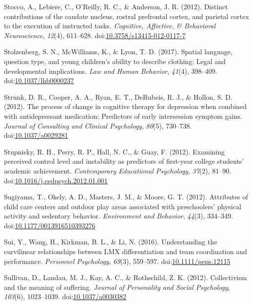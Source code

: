 \documentclass[english,man]{apa6}
\begin{document}
\hypertarget{ref-Stocco2012}{}
Stocco, A., Lebiere, C., O'Reilly, R. C., \& Anderson, J. R. (2012).
Distinct contributions of the caudate nucleus, rostral prefrontal
cortex, and parietal cortex to the execution of instructed tasks.
\emph{Cognitive, Affective, \& Behavioral Neuroscience}, \emph{12}(4),
611--628.
doi:\href{https://doi.org/10.3758/s13415-012-0117-7}{10.3758/s13415-012-0117-7}

\hypertarget{ref-Stolzenberg2017}{}
Stolzenberg, S. N., McWilliams, K., \& Lyon, T. D. (2017). Spatial
language, question type, and young children's ability to describe
clothing: Legal and developmental implications. \emph{Law and Human
Behavior}, \emph{41}(4), 398--409.
doi:\href{https://doi.org/10.1037/lhb0000237}{10.1037/lhb0000237}

\hypertarget{ref-Strunk2012}{}
Strunk, D. R., Cooper, A. A., Ryan, E. T., DeRubeis, R. J., \& Hollon,
S. D. (2012). The process of change in cognitive therapy for depression
when combined with antidepressant medication: Predictors of early
intersession symptom gains. \emph{Journal of Consulting and Clinical
Psychology}, \emph{80}(5), 730--738.
doi:\href{https://doi.org/10.1037/a0029281}{10.1037/a0029281}

\hypertarget{ref-Stupnisky2012}{}
Stupnisky, R. H., Perry, R. P., Hall, N. C., \& Guay, F. (2012).
Examining perceived control level and instability as predictors of
first-year college students' academic achievement. \emph{Contemporary
Educational Psychology}, \emph{37}(2), 81--90.
doi:\href{https://doi.org/10.1016/j.cedpsych.2012.01.001}{10.1016/j.cedpsych.2012.01.001}

\hypertarget{ref-Sugiyama2012}{}
Sugiyama, T., Okely, A. D., Masters, J. M., \& Moore, G. T. (2012).
Attributes of child care centers and outdoor play areas associated with
preschoolers' physical activity and sedentary behavior.
\emph{Environment and Behavior}, \emph{44}(3), 334--349.
doi:\href{https://doi.org/10.1177/0013916510393276}{10.1177/0013916510393276}

\hypertarget{ref-Sui2016}{}
Sui, Y., Wang, H., Kirkman, B. L., \& Li, N. (2016). Understanding the
curvilinear relationships between LMX differentiation and team
coordination and performance. \emph{Personnel Psychology}, \emph{69}(3),
559--597.
doi:\href{https://doi.org/10.1111/peps.12115}{10.1111/peps.12115}

\hypertarget{ref-Sullivan2012}{}
Sullivan, D., Landau, M. J., Kay, A. C., \& Rothschild, Z. K. (2012).
Collectivism and the meaning of suffering. \emph{Journal of Personality
and Social Psychology}, \emph{103}(6), 1023--1039.
doi:\href{https://doi.org/10.1037/a0030382}{10.1037/a0030382}
\end{document}
